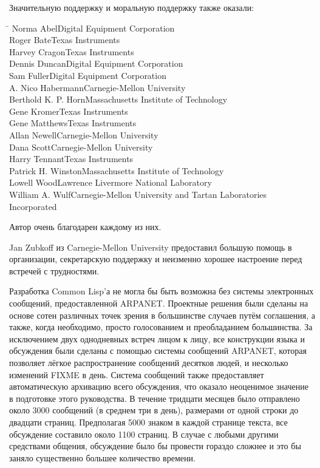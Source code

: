 Значительную поддержку и моральную поддержку также оказали:
\begin{tabbing}
\hskip1.5in\=\kill
Norma Abel\>Digital Equipment Corporation \\
Roger Bate\>Texas Instruments \\
Harvey Cragon\>Texas Instruments \\
Dennis Duncan\>Digital Equipment Corporation \\
Sam Fuller\>Digital Equipment Corporation \\
A. Nico Habermann\>Carnegie-Mellon University \\
Berthold K. P. Horn\>Massachusetts Institute of Technology \\
Gene Kromer\>Texas Instruments \\
Gene Matthews\>Texas Instruments \\
Allan Newell\>Carnegie-Mellon University \\
Dana Scott\>Carnegie-Mellon University \\
Harry Tennant\>Texas Instruments \\
Patrick H. Winston\>Massachusetts Institute of Technology \\
Lowell Wood\>Lawrence Livermore National Laboratory \\
William A. Wulf\>Carnegie-Mellon University and Tartan Laboratories \\
               \>Incorporated
\end{tabbing}
Автор очень благодарен каждому из них.

Jan Zubkoff из Carnegie-Mellon University
предоставил большую помощь в организации, секретарскую поддержку и неизменно
хорошее настроение перед встречей с трудностями.

Разработка Common Lisp'а не могла бы быть возможна без системы электронных
сообщений, предоставленной ARPANET.
Проектные решения были сделаны на основе сотен различных точек зрения в
большинстве случаев путём соглашения, а также, когда необходимо, просто
голосованием и преобладанием большинства.
За исключением двух однодневных встреч лицом к лицу, все конструкции языка и
обсуждения были сделаны с помощью системы сообщений {ARPANET}, которая позволяет лёгкое
распространение сообщений десятков людей, и несколько изменений FIXME в день.
Система сообщений также предоставляет автоматическую архивацию всего обсуждения,
что оказало неоценимое значение в подготовке этого руководства. В течение
тридцати месяцев было отправлено около 3000 сообщений (в среднем три в день),
размерами от одной строки до двадцати страниц. Предполагая 5000 знаком в каждой
странице текста, все обсуждение составило около 1100 страниц. В случае с любыми другими
средствами общения, обсуждение было бы провести гораздо сложнее и это бы заняло
существенно большее количество времени.

